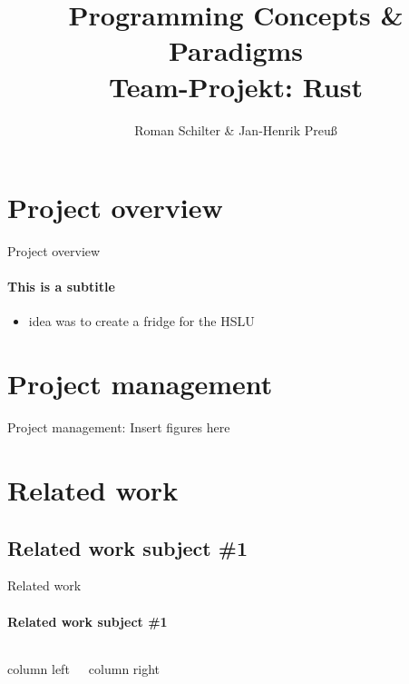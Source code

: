 \documentclass[aspectratio=169, professionalfonts]{beamer}
\title[PCP-Rust]{Programming Concepts \& Paradigms\\ Team-Projekt: Rust}
\author[Schilter \& Preuß]{Roman Schilter \& Jan-Henrik Preuß}
\begin{document}
    \typesetFrontSlides




    \section{Project overview}


    \begin{frame}{Project overview}
        \framesubtitle{This is a subtitle}
        \begin{itemize}
            \item idea was to create a fridge for the HSLU
        \end{itemize}

    \end{frame}



    \section{Project management}


    \begin{frame}{Project management:}
        Insert figures here

    \end{frame}



    \section{Related work}


    \subsection{Related work subject \#1}

    \begin{frame}{Related work}
        \framesubtitle{Related work subject \#1}
        \begin{columns}[T]

            column left

            column right
        \end{columns}


    \end{frame}
\end{document}
